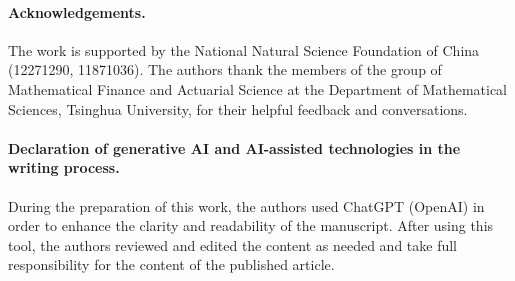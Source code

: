 \documentclass[11pt,reqno]{article}%
\numberwithin{equation}{section}
\begin{document}

\paragraph{Acknowledgements.} The work is supported by the National Natural Science Foundation of China (12271290, 11871036). The authors thank the members of the group of Mathematical Finance and Actuarial Science at the Department of Mathematical Sciences, Tsinghua University, for their helpful feedback and conversations.

\paragraph{\bf Declaration of generative AI and AI-assisted technologies in the writing process.} During the preparation of this work, the authors used ChatGPT (OpenAI) in order to enhance the clarity and readability of the manuscript. After using this tool, the authors reviewed and edited the content as needed and take full responsibility for the content of the published article. 



\end{document}
